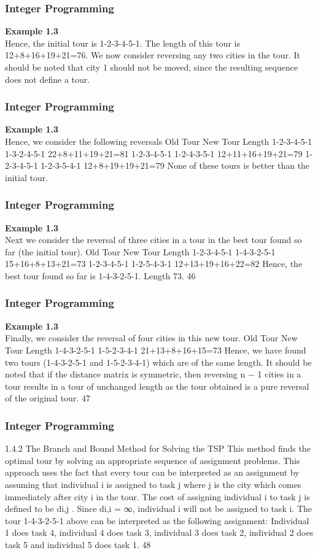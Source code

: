 \begin{frame} 
\frametitle{Integer Programming}     
\noindent\textbf{Example 1.3}\\
Hence, the initial tour is 1-2-3-4-5-1.
The length of this tour is 12+8+16+19+21=76.
We now consider reversing any two cities in the tour.
It should be noted that city 1 should not be moved, since the
resulting sequence does not define a tour.
\end{frame}  
\begin{frame} 
\frametitle{Integer Programming}     
\noindent \textbf{Example 1.3}\\
Hence, we consider the following reversals
Old Tour New Tour Length
1-2-3-4-5-1 1-3-2-4-5-1 22+8+11+19+21=81
1-2-3-4-5-1 1-2-4-3-5-1 12+11+16+19+21=79
1-2-3-4-5-1 1-2-3-5-4-1 12+8+19+19+21=79
None of these tours is better than the initial tour.
\end{frame}  
\begin{frame} 
\frametitle{Integer Programming}     
\noindent \textbf{Example 1.3}\\
Next we consider the reversal of three cities in a tour in the best
tour found so far (the initial tour).
Old Tour New Tour Length
1-2-3-4-5-1 1-4-3-2-5-1 15+16+8+13+21=73
1-2-3-4-5-1 1-2-5-4-3-1 12+13+19+16+22=82
Hence, the best tour found so far is 1-4-3-2-5-1. Length 73.
46 \end{frame}  \begin{frame} \frametitle{Integer Programming}     
\noindent \textbf{Example 1.3}\\
Finally, we consider the reversal of four cities in this new tour.
Old Tour New Tour Length
1-4-3-2-5-1 1-5-2-3-4-1 21+13+8+16+15=73
Hence, we have found two tours (1-4-3-2-5-1 and 1-5-2-3-4-1)
which are of the same length.
It should be noted that if the distance matrix is symmetric, then
reversing n − 1 cities in a tour results in a tour of unchanged
length as the tour obtained is a pure reversal of the original tour.
47 \end{frame}  
\begin{frame} 
\frametitle{Integer Programming}     
1.4.2 The Branch and Bound Method for Solving the TSP
This method finds the optimal tour by solving an appropriate
sequence of assignment problems.
This approach uses the fact that every tour can be interpreted as
an assignment by assuming that individual i is assigned to task j
where j is the city which comes immediately after city i in the tour.
The cost of assigning individual i to task j is defined to be di,j
.
Since di,i = ∞, individual i will not be assigned to task i.
The tour 1-4-3-2-5-1 above can be interpreted as the following
assignment: Individual 1 does task 4, individual 4 does task 3,
individual 3 does task 2, individual 2 does task 5 and individual 5
does task 1.
48 
\end{frame}  

